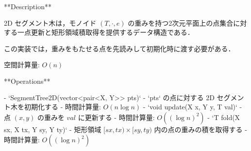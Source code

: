 \begin{small}
\begin{markdown}
**Description**

2D セグメント木は，モノイド $(T, \cdot, e)$ の重みを持つ2次元平面上の点集合に対する一点更新と矩形領域積取得を提供するデータ構造である．

この実装では，重みをもたせる点を先読みして初期化時に渡す必要がある．

空間計算量: $O(n)$

**Operations**

- `SegmentTree2D(vector<pair<X, Y>> pts)`
    - `pts` の点に対する 2D セグメント木を初期化する
    - 時間計算量: $O(n\log n)$
- `void update(X x, Y y, T val)`
    - 点 $(x, y)$ の重みを $val$ に更新する
    - 時間計算量: $O((\log n)^2)$
- `T fold(X sx, X tx, Y sy, Y ty)`
    - 矩形領域 $[sx, tx) \times [sy, ty)$ 内の点の重みの積を取得する
    - 時間計算量: $O((\log n)^2)$

\end{markdown}
\end{small}

